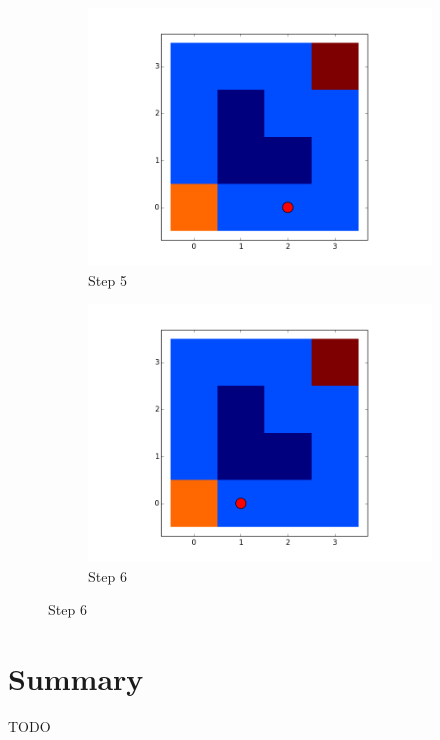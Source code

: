 \documentclass[paper=a4, fontsize=11pt]{scrartcl}
\numberwithin{equation}{section}		%
\numberwithin{figure}{section}			%
\numberwithin{table}{section}		    %
\begin{document}
\begin{figure}[H]
\begin{subfigure}[b]{0.5\textwidth}
			\includegraphics[width=\textwidth]{move_ex_1_step_05}
			\caption{Step 5}
			\label{fig:5}
		\end{subfigure}
		\begin{subfigure}[b]{0.5\textwidth}
			\includegraphics[width=\textwidth]{move_ex_1_step_06}
			\caption{Step 6}
			\label{fig:6}
		\end{subfigure}
	\end{figure}
	
	\section{Summary}
	TODO
	
\end{document}
